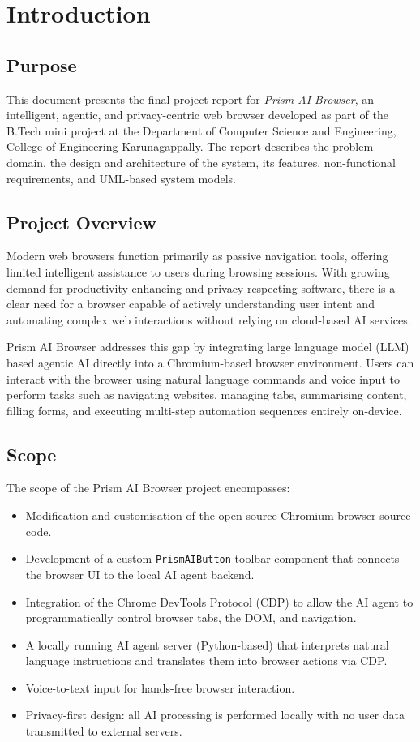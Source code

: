 \chapter{Introduction}

\section{Purpose}
This document presents the final project report for \textit{Prism AI Browser}, an intelligent, agentic, and privacy-centric web browser developed as part of the B.Tech mini project at the Department of Computer Science and Engineering, College of Engineering Karunagappally. The report describes the problem domain, the design and architecture of the system, its features, non-functional requirements, and UML-based system models.

\section{Project Overview}
Modern web browsers function primarily as passive navigation tools, offering limited intelligent assistance to users during browsing sessions. With growing demand for productivity-enhancing and privacy-respecting software, there is a clear need for a browser capable of actively understanding user intent and automating complex web interactions without relying on cloud-based AI services.

Prism AI Browser addresses this gap by integrating large language model (LLM) based agentic AI directly into a Chromium-based browser environment. Users can interact with the browser using natural language commands and voice input to perform tasks such as navigating websites, managing tabs, summarising content, filling forms, and executing multi-step automation sequences entirely on-device.

\section{Scope}
The scope of the Prism AI Browser project encompasses:
\begin{itemize}[leftmargin=*]
    \item Modification and customisation of the open-source Chromium browser source code.
    \item Development of a custom \texttt{PrismAIButton} toolbar component that connects the browser UI to the local AI agent backend.
    \item Integration of the Chrome DevTools Protocol (CDP) to allow the AI agent to programmatically control browser tabs, the DOM, and navigation.
    \item A locally running AI agent server (Python-based) that interprets natural language instructions and translates them into browser actions via CDP.
    \item Voice-to-text input for hands-free browser interaction.
    \item Privacy-first design: all AI processing is performed locally with no user data transmitted to external servers.
\end{itemize}

